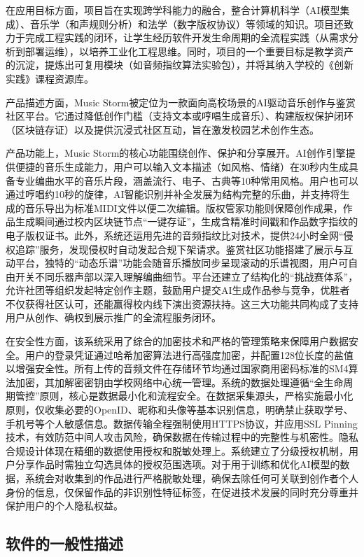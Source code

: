 \documentclass{base}
\numberwithin{figure}{section} %
\begin{document}
在应用目标方面，项目旨在实现跨学科能力的融合，整合计算机科学（AI模型集成）、音乐学（和声规则分析）和法学（数字版权协议）等领域的知识。项目还致力于完成工程实践的闭环，让学生经历软件开发生命周期的全流程实践（从需求分析到部署运维），以培养工业化工程思维。同时，项目的一个重要目标是教学资产的沉淀，提炼出可复用模块（如音频指纹算法实验包），并将其纳入学校的《创新实践》课程资源库。

产品描述方面，Music Storm被定位为一款面向高校场景的AI驱动音乐创作与鉴赏社区平台。它通过降低创作门槛（支持文本或哼唱生成音乐）、构建版权保护闭环（区块链存证）以及提供沉浸式社区互动，旨在激发校园艺术创作生态。

产品功能上，Music Storm的核心功能围绕创作、保护和分享展开。AI创作引擎提供便捷的音乐生成能力，用户可以输入文本描述（如风格、情绪）在30秒内生成具备专业编曲水平的音乐片段，涵盖流行、电子、古典等10种常用风格。用户也可以通过哼唱约10秒的旋律，AI智能识别并补全发展为结构完整的乐曲，并支持将生成的音乐导出为标准MIDI文件以便二次编辑。版权管家功能则保障创作成果，作品生成瞬间通过校内区块链节点“一键存证”，生成含精准时间戳和作品数字指纹的电子版权证书。此外，系统还运用先进的音频指纹比对技术，提供24小时全网“侵权追踪”服务，发现侵权时自动发起合规下架请求。鉴赏社区功能搭建了展示与互动平台，独特的“动态乐谱”功能会随音乐播放同步呈现滚动的乐谱视图，用户可自由开关不同乐器声部以深入理解编曲细节。平台还建立了结构化的“挑战赛体系”，允许社团等组织发起特定创作主题，鼓励用户提交AI生成作品参与竞争，优胜者不仅获得社区认可，还能赢得校内线下演出资源扶持。这三大功能共同构成了支持用户从创作、确权到展示推广的全流程服务闭环。

在安全性方面，该系统采用了综合的加密技术和严格的管理策略来保障用户数据安全。用户的登录凭证通过哈希加密算法进行高强度加密，并配置128位长度的盐值以增强安全性。所有上传的音频文件在存储环节均通过国家商用密码标准的SM4算法加密，其加解密密钥由学校网络中心统一管理。系统的数据处理遵循“全生命周期管控”原则，核心是数据最小化和流程安全。在数据采集源头，严格实施最小化原则，仅收集必要的OpenID、昵称和头像等基本识别信息，明确禁止获取学号、手机号等个人敏感信息。数据传输全程强制使用HTTPS协议，并应用SSL Pinning技术，有效防范中间人攻击风险，确保数据在传输过程中的完整性与机密性。隐私合规设计体现在精细的数据使用授权和脱敏处理上。系统建立了分级授权机制，用户分享作品时需独立勾选具体的授权范围选项。对于用于训练和优化AI模型的数据，系统会对收集到的作品进行严格脱敏处理，确保去除任何可关联到创作者个人身份的信息，仅保留作品的非识别性特征标签，在促进技术发展的同时充分尊重并保护用户的个人隐私权益。

\subsection{软件的一般性描述}
\end{document}
